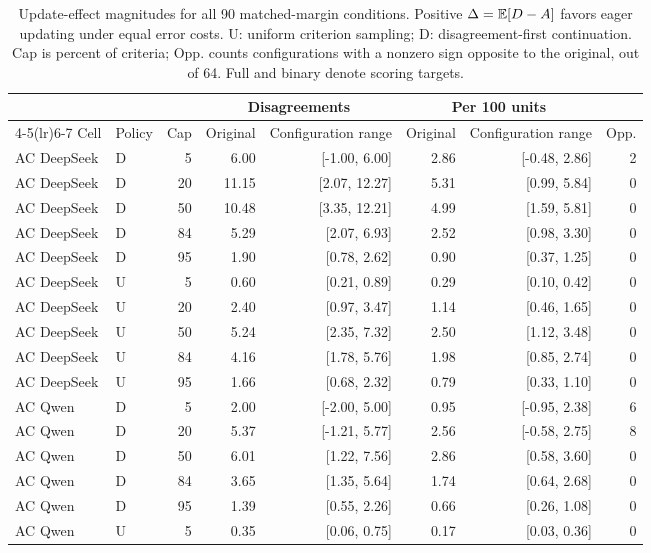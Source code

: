 \clearpage
\begin{table}[!ht]
\caption{Update-effect magnitudes for all 90 matched-margin conditions. Positive $\Delta=\mathbb{E}[D-A]$ favors eager updating under equal error costs. U: uniform criterion sampling; D: disagreement-first continuation. Cap is percent of criteria; Opp. counts configurations with a nonzero sign opposite to the original, out of 64. Full and binary denote scoring targets.}\label{tab:amplitudes}
\centering\small
\setlength{\tabcolsep}{2pt}
\begin{tabular}{llrrrrrr}
\toprule
& & & \multicolumn{2}{c}{Disagreements} & \multicolumn{2}{c}{Per 100 units} &\\
\cmidrule(lr){4-5}\cmidrule(lr){6-7}
Cell & Policy & Cap & Original & Configuration range & Original & Configuration range & Opp.\\
\midrule
AC DeepSeek & D & 5 & 6.00 & [-1.00, 6.00] & 2.86 & [-0.48, 2.86] & 2 \\
AC DeepSeek & D & 20 & 11.15 & [2.07, 12.27] & 5.31 & [0.99, 5.84] & 0 \\
AC DeepSeek & D & 50 & 10.48 & [3.35, 12.21] & 4.99 & [1.59, 5.81] & 0 \\
AC DeepSeek & D & 84 & 5.29 & [2.07, 6.93] & 2.52 & [0.98, 3.30] & 0 \\
AC DeepSeek & D & 95 & 1.90 & [0.78, 2.62] & 0.90 & [0.37, 1.25] & 0 \\
AC DeepSeek & U & 5 & 0.60 & [0.21, 0.89] & 0.29 & [0.10, 0.42] & 0 \\
AC DeepSeek & U & 20 & 2.40 & [0.97, 3.47] & 1.14 & [0.46, 1.65] & 0 \\
AC DeepSeek & U & 50 & 5.24 & [2.35, 7.32] & 2.50 & [1.12, 3.48] & 0 \\
AC DeepSeek & U & 84 & 4.16 & [1.78, 5.76] & 1.98 & [0.85, 2.74] & 0 \\
AC DeepSeek & U & 95 & 1.66 & [0.68, 2.32] & 0.79 & [0.33, 1.10] & 0 \\
AC Qwen & D & 5 & 2.00 & [-2.00, 5.00] & 0.95 & [-0.95, 2.38] & 6 \\
AC Qwen & D & 20 & 5.37 & [-1.21, 5.77] & 2.56 & [-0.58, 2.75] & 8 \\
AC Qwen & D & 50 & 6.01 & [1.22, 7.56] & 2.86 & [0.58, 3.60] & 0 \\
AC Qwen & D & 84 & 3.65 & [1.35, 5.64] & 1.74 & [0.64, 2.68] & 0 \\
AC Qwen & D & 95 & 1.39 & [0.55, 2.26] & 0.66 & [0.26, 1.08] & 0 \\
AC Qwen & U & 5 & 0.35 & [0.06, 0.75] & 0.17 & [0.03, 0.36] & 0 \\

\end{tabular}
\end{table}
